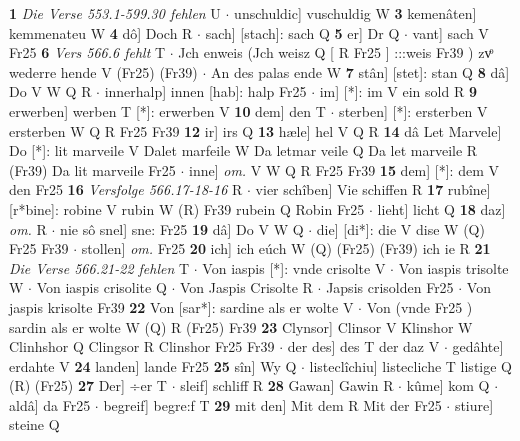 \documentclass[8pt,a4paper,notitlepage]{article}
\begin{document}
\begin{table}[ht]
\begin{minipage}[t]{0.5\linewidth}
\textbf{1} \textit{Die Verse 553.1-599.30 fehlen} U   $\cdot$ unschuldic] vuschuldig W \textbf{3} kemenâten] kemmenateu W \textbf{4} dô] Doch R  $\cdot$ sach] [stach]: sach Q \textbf{5} er] Dr Q  $\cdot$ vant] sach V Fr25 \textbf{6} \textit{Vers 566.6 fehlt} T   $\cdot$ Jch enweis (Jch weisz Q [ R Fr25 ] :::weis Fr39 ) zvͦ wederre hende V (Fr25) (Fr39)  $\cdot$ An des palas ende W \textbf{7} stân] [stet]: stan Q \textbf{8} dâ] Do V W Q R  $\cdot$ innerhalp] innen [hab]: halp Fr25  $\cdot$ im] [*]: im V ein sold R \textbf{9} erwerben] werben T [*]: erwerben V \textbf{10} dem] den T  $\cdot$ sterben] [*]: ersterben V ersterben W Q R Fr25 Fr39 \textbf{12} ir] irs Q \textbf{13} hæle] hel V Q R \textbf{14} dâ Let Marvele] Do [*]: lit marveile V Dalet marfeile W Da letmar veile Q Da let marveile R (Fr39) Da lit marveile Fr25  $\cdot$ inne] \textit{om.} V W Q R Fr25 Fr39 \textbf{15} dem] [*]: dem V den Fr25 \textbf{16} \textit{Versfolge 566.17-18-16} R   $\cdot$ vier schîben] Vie schiffen R \textbf{17} rubîne] [r*bine]: robine V rubin W (R) Fr39 rubein Q Robin Fr25  $\cdot$ lieht] licht Q \textbf{18} daz] \textit{om.} R  $\cdot$ nie sô snel] sne: Fr25 \textbf{19} dâ] Do V W Q  $\cdot$ die] [di*]: die V dise W (Q) Fr25 Fr39  $\cdot$ stollen] \textit{om.} Fr25 \textbf{20} ich] ich eúch W (Q) (Fr25) (Fr39) ich ie R \textbf{21} \textit{Die Verse 566.21-22 fehlen} T   $\cdot$ Von iaspis [*]: vnde crisolte V  $\cdot$ Von iaspis trisolte W  $\cdot$ Von iaspis crisolite Q  $\cdot$ Von Jaspis Crisolte R  $\cdot$ Japsis crisolden Fr25  $\cdot$ Von jaspis krisolte Fr39 \textbf{22} Von [sar*]: sardine als er wolte V  $\cdot$ Von (vnde Fr25 ) sardin als er wolte W (Q) R (Fr25) Fr39 \textbf{23} Clynsor] Clinsor V Klinshor W Clinhshor Q Clingsor R Clinshor Fr25 Fr39  $\cdot$ der des] des T der daz V  $\cdot$ gedâhte] erdahte V \textbf{24} landen] lande Fr25 \textbf{25} sîn] Wy Q  $\cdot$ listeclîchiu] listecliche T listige Q (R) (Fr25) \textbf{27} Der] ÷er T  $\cdot$ sleif] schliff R \textbf{28} Gawan] Gawin R  $\cdot$ kûme] kom Q  $\cdot$ aldâ] da Fr25  $\cdot$ begreif] begre:f T \textbf{29} mit den] Mit dem R Mit der Fr25  $\cdot$ stiure] steine Q \newline
\end{minipage}
\end{table}
\end{document}
